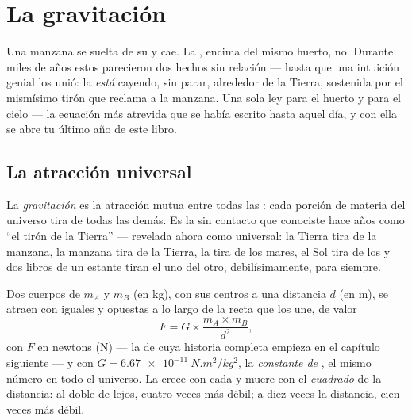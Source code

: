\chapter{La gravitación}\label{ch:g9:gravitation}

Una manzana se suelta de su  y cae. La , encima del
mismo huerto, no. Durante miles de años estos parecieron dos hechos sin
relación --- hasta que una intuición genial los unió: la
 \emph{está} cayendo, sin parar, alrededor de la Tierra,
sostenida por el mismísimo tirón que reclama a la manzana. Una sola ley
para el huerto y para el cielo --- la ecuación más atrevida que se
había escrito hasta aquel día, y con ella se abre tu último año de este
libro.

\section{La atracción universal}

\begin{definition}[Gravitación]\label{def:g9:gravitation:gravitation}
La \emph{gravitación} es la atracción mutua entre
todas las : cada porción de materia del universo tira de todas las
demás. Es la  sin contacto que conociste hace años como ``el
tirón de la Tierra'' --- revelada ahora como universal: la Tierra tira
de la manzana, la manzana tira de la Tierra, la  tira de los
mares, el Sol tira de los  y dos libros de un estante tiran
el uno del otro, debilísimamente, para siempre.
\end{definition}

\begin{proposition}\label{prop:g9:gravitation:law}
Dos cuerpos de  $m_A$ y $m_B$ (en \unit{kg}), con sus centros a
una distancia $d$ (en \unit{m}), se atraen con
 iguales y opuestas a lo largo de la recta que los une, de
valor
\[
F = G \times \frac{m_A \times m_B}{d^2},
\]
con $F$ en newtons (\unit{N}) --- la  de
 cuya historia completa empieza en el capítulo siguiente
--- y con $G = \qty{6.67e-11}{N.m^2/kg^2}$, la \emph{constante de
}, el mismo número en todo el universo. La
 crece con cada  y muere con el
\emph{cuadrado} de la distancia: al doble de lejos, cuatro veces más
débil; a diez veces la distancia, cien veces más débil.
\end{proposition}

